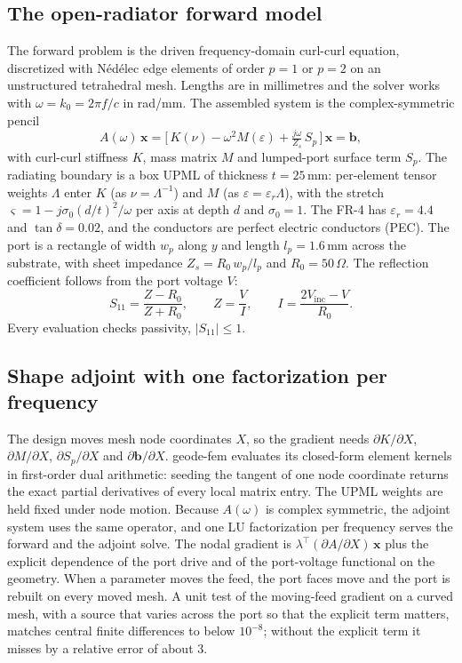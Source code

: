 \documentclass{anvil-paper}
\begin{document}
\subsection{The open-radiator forward model}
\label{sec:pencil}

The forward problem is the driven frequency-domain curl-curl equation,
discretized with N\'ed\'elec edge elements of order $p = 1$ or $p = 2$ on an
unstructured tetrahedral mesh. Lengths are in millimetres and the solver
works with $\omega = k_0 = 2\pi f/c$ in rad/mm. The assembled system is the
complex-symmetric pencil
\begin{equation}
  A(\omega)\,\mathbf{x}
  = \Big[\,K(\nu) - \omega^2 M(\varepsilon) + \tfrac{j\omega}{Z_s}\,S_p\,\Big]\,\mathbf{x}
  = \mathbf{b},
  \label{eq:pencil}
\end{equation}
with curl-curl stiffness $K$, mass matrix $M$ and lumped-port surface term
$S_p$. The radiating boundary is a box UPML of thickness $t = 25$\,mm:
per-element tensor weights $\Lambda$ enter $K$ (as $\nu = \Lambda^{-1}$) and
$M$ (as $\varepsilon = \varepsilon_r \Lambda$), with the stretch
$\varsigma = 1 - j\sigma_0 (d/t)^2/\omega$ per axis at depth $d$ and
$\sigma_0 = 1$. The FR-4 has $\varepsilon_r = 4.4$ and $\tan\delta = 0.02$,
and the conductors are perfect electric conductors (PEC). The port is a
rectangle of width $w_p$ along $y$ and length $l_p = 1.6$\,mm across the
substrate, with sheet impedance $Z_s = R_0\,w_p/l_p$ and $R_0 = 50\,\Omega$.
The reflection coefficient follows from the port voltage $V$:
\begin{equation}
  S_{11} = \frac{Z - R_0}{Z + R_0},\qquad Z = \frac{V}{I},\qquad
  I = \frac{2V_{\mathrm{inc}} - V}{R_0}.
  \label{eq:s11}
\end{equation}
Every evaluation checks passivity, $|S_{11}| \le 1$.

\subsection{Shape adjoint with one factorization per frequency}
\label{sec:adjoint}

The design moves mesh node coordinates $X$, so the gradient needs
$\partial K/\partial X$, $\partial M/\partial X$, $\partial S_p/\partial X$
and $\partial \mathbf{b}/\partial X$. geode-fem evaluates its closed-form
element kernels in first-order dual arithmetic: seeding the tangent of one
node coordinate returns the exact partial derivatives of every local matrix
entry. The UPML weights are held fixed under node motion. Because $A(\omega)$
is complex symmetric, the adjoint system uses the same operator, and one LU
factorization per frequency serves the forward and the adjoint solve. The
nodal gradient is $\lambda^{\top}(\partial A/\partial X)\,\mathbf{x}$ plus the
explicit dependence of the port drive and of the port-voltage functional on
the geometry. When a parameter moves the feed, the port faces move and the
port is rebuilt on every moved mesh. A unit test of the moving-feed gradient
on a curved mesh, with a source that varies across the port so that the
explicit term matters, matches central finite differences to below
$10^{-8}$; without the explicit term it misses by a relative error of about 3.
\end{document}
